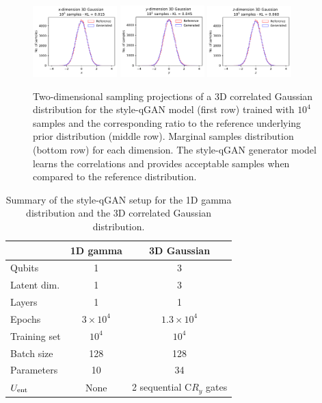 \documentclass[twocolumn,preprintnumbers,superscriptaddress]{revtex4-2}
\begin{document}
\begin{figure}
  \includegraphics[width=0.29\textwidth]{plots/3Dgaussian_posdef/1-distribution_3dgaussian_100k.pdf}%
  \includegraphics[width=0.29\textwidth]{plots/3Dgaussian_posdef/2-distribution_3dgaussian_100k.pdf}%
  \includegraphics[width=0.29\textwidth]{plots/3Dgaussian_posdef/3-distribution_3dgaussian_100k.pdf}

  \caption{\label{fig:3dgauss}Two-dimensional sampling projections of a 3D
  correlated Gaussian distribution for the style-qGAN model (first row) trained
  with $10^4$ samples and the corresponding ratio to the reference underlying
  prior distribution (middle row). Marginal samples distribution (bottom row)
  for each dimension. The style-qGAN generator model learns the correlations and
  provides acceptable samples when compared to the reference distribution.}
\end{figure}

\begin{table}
  \begin{tabular}{l|c|c}
     & {\bf 1D gamma} & {\bf 3D Gaussian} \tabularnewline
    \hline
    Qubits & 1 & 3 \tabularnewline
    Latent dim. & 1 & 3 \tabularnewline
    Layers & 1 & 1 \tabularnewline
    Epochs & $3\times10^4$ & $1.3\times10^4$ \tabularnewline
    Training set & $10^4$ & $10^4$ \tabularnewline
    Batch size & 128 & 128 \tabularnewline
    Parameters & 10 & 34 \tabularnewline
    $U_{\rm ent}$ & None & 2 sequential C$R_y$ gates \tabularnewline
    \hline
  \end{tabular}

  \caption{\label{table:summary} Summary of the style-qGAN setup for the 1D
  gamma distribution and the 3D correlated Gaussian distribution.}
\end{table}
\end{document}
